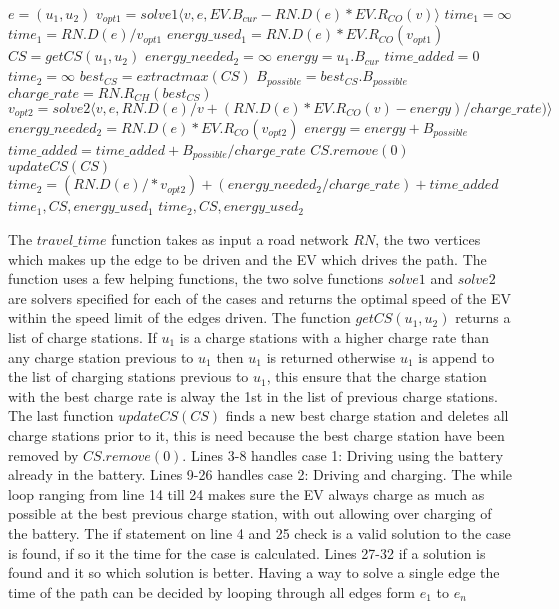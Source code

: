 \begin{algorithmic}[1]
	\State $e = (u_1, u_2)$
	\State $v_{opt1} = solve1\langle v, e, EV.B_{cur}-RN.D(e)*EV.R_{CO}(v)\rangle$
		\State $time_1 = \infty$
	\Else
		\State $time_1 = RN.D(e) / v_{opt1}$
		\State $energy\_used_{1} = RN.D(e)*EV.R_{CO}(v_{opt1})$
	\EndIf
		\State $CS = getCS(u_1, u_2)$ 
		\State $energy\_needed_{2} = \infty$
		\State $energy = u_1.B_{cur}$
		\State $time\_added = 0$
		\State $time_2 = \infty$
		\State $best_{CS} = extractmax(CS)$
		\State $B_{possible} = best_{CS}.B_{possible}$
		\State $charge\_rate = RN.R_{CH}(best_{CS})$
		\State $v_{opt2} = solve2 \langle v, e,  RN.D(e)/v + (RN.D(e)* 
			EV.R_{CO}(v)-energy)/charge\_rate) \rangle$
		\State $energy\_needed_{2} = RN.D(e)*EV.R_{CO}(v_{opt2})$
		\State $energy = energy + B_{possible}$
			\State $time\_added = time\_added + B_{possible}/charge\_rate$
			\State $CS.remove(0)$
			\State $updateCS(CS)$
		\EndIf	
	\EndWhile
		\State $time_2 = (RN.D(e)/*v_{opt2}) + (energy\_needed_{2}/charge\_rate) + time\_added$
	\EndIf
		\State \Return $time_1, CS, energy\_used_1$
	\Else
		\State \Return $time_2, CS, energy\_used_2$
	\EndIf

\EndFunction
\end{algorithmic}\label{alg:fastest_path}

The $travel\_time$ function takes as input a road network $RN$, the two vertices which makes up the edge to be driven and the EV which drives the path. The function uses a few helping functions, the two solve functions $solve1$ and $solve2$ are solvers specified for each of the cases and returns the optimal speed of the EV within the speed limit of the edges driven. The function $getCS(u_1, u_2)$ returns a list of charge stations. If $u_1$ is a charge stations with a higher charge rate than any charge station previous to $u_1$ then $u_1$ is returned otherwise $u_1$ is append to the list of charging stations previous to $u_1$, this ensure that the charge station with the best charge rate is alway the 1st in the list of previous charge stations. The last function $updateCS(CS)$ finds a new best charge station and deletes all charge stations prior to it, this is need because the best charge station have been removed by $CS.remove(0)$. Lines 3-8 handles case 1: Driving using the battery already in the battery. Lines 9-26 handles case 2: Driving and charging. The while loop ranging from line 14 till 24 makes sure the EV always charge as much as possible at the best previous charge station, with out allowing over charging of the battery. The if statement on line 4 and 25 check is a valid solution to the case is found, if so it the time for the case is calculated. Lines 27-32 if a solution is found and it so which solution is better. Having a way to solve a single edge the time of the path can be decided by looping through all edges form $e_1$ to $e_n$
